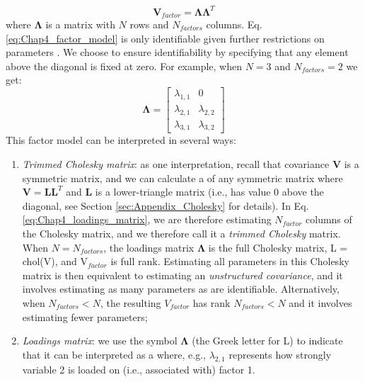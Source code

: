 \begin{equation} \label{eq:Chap4_factor_model}
    \mathbf{V}_{factor} = \mathbf{\Lambda} \mathbf{\Lambda}^T    
\end{equation}
where \(\mathbf{\Lambda}\) is a matrix with \(N\) rows and \(N_{factors}\) columns.  Eq. \ref{eq:Chap4_factor_model} is only identifiable given further restrictions on parameters \cite{zuur_dynamic_2003,zuur_estimating_2003}.  We choose to ensure identifiability by specifying that any element above the diagonal is fixed at zero.  For example, when \(N=3\) and \(N_{factors}=2\) we get:
\begin{equation} \label{eq:Chap4_loadings_matrix}
    \mathbf{\Lambda} = \begin{bmatrix}
    \lambda_{1,1} & 0  \\
    \lambda_{2,1} & \lambda_{2,2} \\
    \lambda_{3,1} & \lambda_{3,2}     
    \end{bmatrix}    
\end{equation}
This factor model can be interpreted in several ways:

\begin{enumerate}
    \item \textit{Trimmed Cholesky matrix}: as one interpretation, recall that covariance \(\mathbf{V}\) is a symmetric matrix, and we can calculate a  of any symmetric matrix where \(\mathbf{V = LL}^T\) and \(\mathbf{L}\) is a lower-triangle matrix (i.e., has value 0 above the diagonal, see Section \ref{sec:Appendix_Cholesky} for details).  In Eq. \ref{eq:Chap4_loadings_matrix}, we are therefore estimating \(N_{factor}\) columns of the Cholesky matrix, and we therefore call it a \textit{trimmed Cholesky} matrix.  When \(N=N_{factors}\), the loadings matrix \(\mathbf{\Lambda}\) is the full Cholesky matrix, \colorbox{backcolour}{L = chol(V)}, and \(\mathrm{V}_{factor}\) is full rank.  Estimating all parameters in this Cholesky matrix is then equivalent to estimating an \textit{unstructured covariance}, and it involves estimating as many parameters as are identifiable. Alternatively, when \(N_{factors}<N\), the resulting \(V_{factor}\) has rank \(N_{factors}<N\) and it involves estimating fewer parameters;   

    \item \textit{Loadings matrix}: we use the symbol \(\mathbf{\Lambda}\) (the Greek letter for L) to indicate that it can be interpreted as a  where, e.g., \(\lambda_{2,1}\) represents how strongly variable 2 is loaded on (i.e., associated with) factor 1.     
\end{enumerate}

